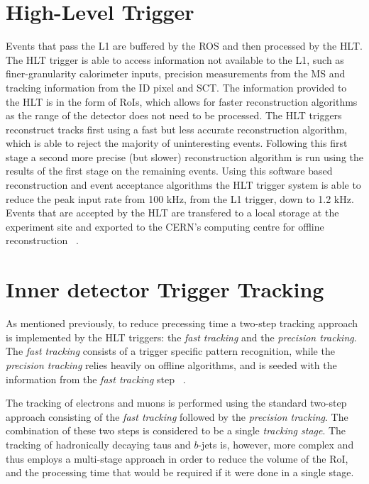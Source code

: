 	\section{High-Level Trigger}
	\label{sec:HLT}
	Events that pass the \ac{L1} are buffered by the \ac{ROS} and then processed by the \ac{HLT}. The \ac{HLT} trigger is able to access information not available to the \ac{L1}, such as finer-granularity calorimeter inputs, precision measurements from the \ac{MS} and tracking information from the \ac{ID} pixel and \ac{SCT}. The information provided to the \ac{HLT} is in the form of \ac{RoI}s, which allows for faster reconstruction algorithms as the range of the detector does not need to be processed. 
	The \ac{HLT} triggers reconstruct tracks first using a fast but less accurate reconstruction algorithm, which is able to reject the majority of uninteresting events. Following this first stage a second more precise (but slower) reconstruction algorithm is run using the results of the first stage on the remaining events. Using this software based reconstruction and event acceptance algorithms the \ac{HLT} trigger system is able to reduce the peak input rate from 100 kHz, from the \ac{L1} trigger, down to 1.2 kHz. Events that are accepted by the \ac{HLT} are transfered to a local storage at the experiment site and exported to the \ac{CERN}'s computing centre for offline reconstruction ~\cite{collaboration_2020}. 
		\section{Inner detector Trigger Tracking}
		\label{sec:idtrigtrack}
		As mentioned previously, to reduce precessing time a two-step tracking approach is implemented by the \ac{HLT} triggers: the \textit{fast tracking} and the \textit{precision tracking}.
	The \textit{fast tracking} consists of a trigger specific pattern recognition, while the \textit{precision tracking} relies heavily on offline algorithms, and is seeded with the information from the \textit{fast tracking} step ~\cite{ATLASTrigger2015,ATL-DAQ-PUB-2013-002}.
	
	The tracking of electrons and muons is performed using the standard two-step approach consisting of the \textit{fast tracking} followed by the \textit{precision tracking}. The combination of these two steps is considered to be a single \textit{tracking stage}. The tracking of hadronically decaying taus and $b$-jets is, however, more complex and thus employs a multi-stage approach in order to reduce the volume of the \ac{RoI}, and the processing time that would be required if it were done in a single stage.
